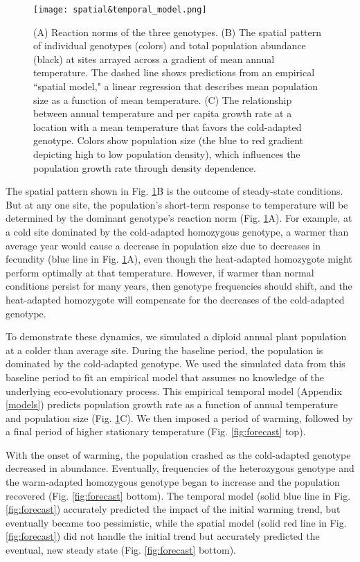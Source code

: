 \documentclass[11pt]{article}
\begin{document}
\begin{figure}[tbp]
\centering
\texttt{[image: spatial\&temporal\_model.png]}
\caption{(A) Reaction norms of the three genotypes. (B) The spatial pattern of individual genotypes (colors) and total population abundance (black) at sites arrayed across a gradient of mean annual temperature. The dashed line shows predictions from an empirical ``spatial model," a linear regression that describes mean population size as a function of mean temperature. (C) The relationship between annual temperature and per capita growth rate at a location with a mean temperature that favors the cold-adapted genotype. Colors show population size (the blue to red gradient depicting high to low population density), which influences the population growth rate through density dependence. }
\label{fig:evo_evo_spatial_temporal_models}
\end{figure}

The spatial pattern shown in Fig. \ref{fig:evo_evo_spatial_temporal_models}B is the outcome of steady-state conditions. But at any one site, the population's short-term response to temperature will be determined by the dominant genotype's reaction norm (Fig. \ref{fig:evo_evo_spatial_temporal_models}A). For example, at a cold site dominated by the cold-adapted homozygous genotype, a warmer than average year would cause a decrease in population size due to decreases in fecundity (blue line in Fig. \ref{fig:evo_evo_spatial_temporal_models}A), even though the heat-adapted homozygote might perform optimally at that temperature. However, if warmer than normal conditions persist for many years, then genotype frequencies should shift, and the heat-adapted homozygote will compensate for the decreases of the cold-adapted genotype. 

To demonstrate these dynamics, we simulated a diploid annual plant population at a colder than average site. During the baseline period, the population is dominated by the cold-adapted genotype. We used the simulated data from this baseline period to fit an empirical model that assumes no knowledge of the underlying eco-evolutionary process. This empirical temporal model (Appendix \ref{models}) predicts population growth rate as a function of annual temperature and population size (Fig. \ref{fig:evo_evo_spatial_temporal_models}C). We then imposed a period of warming, followed by a final period of higher stationary temperature (Fig. \ref{fig:forecast} top).

With the onset of warming, the population crashed as the cold-adapted genotype decreased in abundance. Eventually, frequencies of the heterozygous genotype and the warm-adapted homozygous genotype began to increase and the population recovered (Fig. \ref{fig:forecast} bottom). The temporal model (solid blue line in Fig. \ref{fig:forecast}) accurately predicted the impact of the initial warming trend, but eventually became too pessimistic, while the spatial model (solid red line in Fig. \ref{fig:forecast}) did not handle the initial trend but accurately predicted the eventual, new steady state (Fig. \ref{fig:forecast} bottom).
\end{document}
